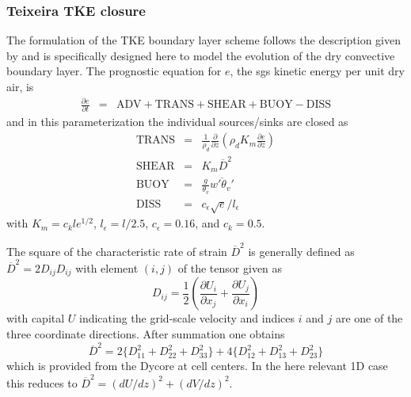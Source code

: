 \documentclass[dvipdfmx,a4paper,10pt]{article}
\begin{document}
% 


\subsubsection{Teixeira TKE closure}

The formulation of the TKE boundary layer scheme follows the description given by \cite{teixeira04} and is specifically designed here to model the evolution of the dry convective boundary layer. The prognostic equation for $e$, the sgs kinetic energy per unit dry air, is
\begin{eqnarray}\label{eqn:tkebudget}
 \frac{\partial e}{\partial t}&=& \mathrm{ADV} + \mathrm{TRANS} + \mathrm{SHEAR} + \mathrm{BUOY} - \mathrm{DISS}
\end{eqnarray}
and in this parameterization the individual sources/sinks are closed as
\begin{eqnarray}
 \mathrm{TRANS} &=& \frac{1}{\rho_d}\frac{\partial}{\partial z} (\rho_d K_m  \frac{\partial e}{\partial z})\\
 \mathrm{SHEAR} &=& K_m \overline{D}^2 \\
 \mathrm{BUOY} &=& \frac{g}{\theta_v}\overline{w'\theta_v'}\\
 \mathrm{DISS}&=& c_{\epsilon}\sqrt{e}/l_{\epsilon}
\end{eqnarray}
with $K_m=c_k l e^{1/2}$, $l_{\epsilon}=l/2.5$, $c_{\epsilon}=0.16$, and $c_k=0.5$.

The square of the characteristic rate of strain $\overline{D}^2$ is generally defined as $\overline{D}^2=2D_{ij}D_{ij}$ with element $(i,j)$ of the tensor given as
\begin{equation}
 D_{ij}=\frac{1}{2}(\frac{\partial U_i}{\partial x_j}+\frac{\partial U_j}{\partial x_i})
\end{equation}
with capital $U$ indicating the grid-scale velocity and indices $i$ and $j$ are one of the three coordinate directions. After summation one obtains 
\begin{equation}\label{eqn:def2}
 \overline{D}^2=2\{D_{11}^2+D_{22}^2+D_{33}^2\}+4\{D_{12}^2+D_{13}^2+D_{23}^2 \}
\end{equation}
which is provided from the Dycore at cell centers. In the here relevant 1D case this reduces to $\overline{D}^2=(dU/dz)^2+(dV/dz)^2$.
\end{document}
